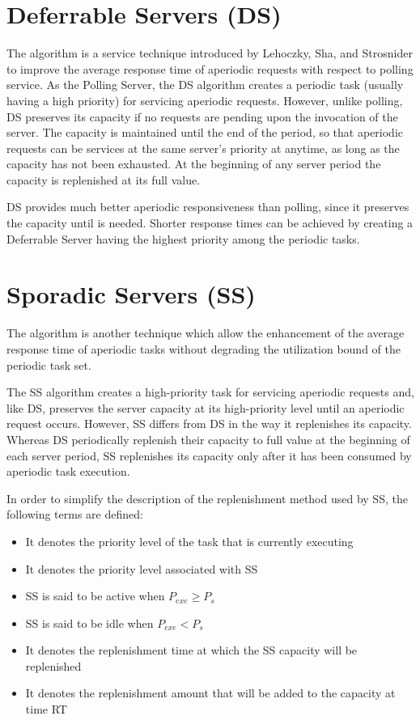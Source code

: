 \section{Deferrable Servers (DS)}
The  algorithm is a service technique introduced by Lehoczky, Sha, and Strosnider to improve the average response time of aperiodic requests with respect to polling service. As the Polling Server, the DS algorithm creates a periodic task (usually having a high priority) for servicing aperiodic requests. However, unlike polling, DS preserves its capacity if no requests are pending upon the invocation of the server. The capacity is maintained until the end of the period, so that aperiodic requests can be services at the same server's priority at anytime, as long as the capacity has not been exhausted. At the beginning of any server period the capacity is replenished at its full value.

DS provides much better aperiodic responsiveness than polling, since it preserves the capacity until is needed. Shorter response times can be achieved by creating a Deferrable Server having the highest priority among the periodic tasks.

\section{Sporadic Servers (SS)}

The  algorithm is another technique which allow the enhancement of the average response time of aperiodic  tasks without degrading the utilization bound of the periodic task set.

The SS algorithm creates a high-priority task for servicing aperiodic requests and, like DS, preserves the server capacity at its high-priority level until an aperiodic request occurs. However, SS differs from DS in the way it replenishes its capacity. Whereas DS periodically replenish their capacity to full value at the beginning of each server period, SS replenishes its capacity only after it has been consumed by aperiodic task execution.

In order to simplify the description of the replenishment method used by SS, the following terms are defined:
\begin{itemize}
    \item{ It denotes the priority level of the task that is currently executing}
    \item{ It denotes the priority level associated with SS}
    \item{SS is said to be active when $P_{exe}\ge P_s$}
    \item{SS is said to be idle when $P_{exe} < P_s$}
    \item{ It denotes the replenishment time at which the SS capacity will be replenished}
    \item{It denotes the replenishment amount that will be added to the capacity at time RT}
\end{itemize}

